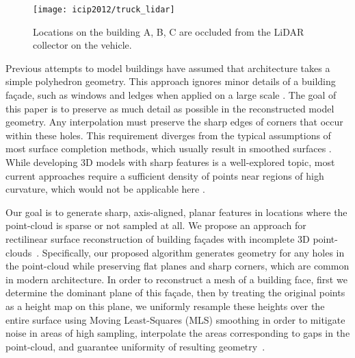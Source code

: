 \documentclass[12pt,onecolumn,oneside]{book}
\begin{document}
\begin{figure}[t]

\begin{minipage}[b]{1.0\linewidth}
  \centering
  \centerline{\texttt{[image: icip2012/truck\_lidar]}}
\end{minipage}

\caption[Scanning building fa\c{c}ades from a vehicle.]{Locations on the building A, B, C are occluded from the LiDAR collector on the vehicle.}
\label{fig:truck_lidar}

\end{figure}

Previous attempts to model buildings have assumed that architecture takes a simple polyhedron geometry. This approach ignores minor details of a building fa\c{c}ade, such as windows and ledges when applied on a large scale \cite{Chauve10, Chen07}.  The goal of this paper is to preserve as much detail as possible in the reconstructed model geometry.  Any interpolation must preserve the sharp edges of corners that occur within these holes.  This requirement diverges from the typical assumptions of most surface completion methods, which usually result in smoothed surfaces \cite{Kazhdan06, Kawai11}.  While developing 3D models with sharp features is a well-explored topic, most current approaches require a sufficient density of points near regions of high curvature, which would not be applicable here \cite{Bernardini04, Mhatre06}.  

Our goal is to generate sharp, axis-aligned, planar features in locations where the point-cloud is sparse or not sampled at all.  We propose an approach for rectilinear surface reconstruction of building fa\c{c}ades with incomplete 3D point-clouds~\cite{Turner12outdoor}.  Specifically, our proposed algorithm generates geometry for any holes in the point-cloud while preserving flat planes and sharp corners, which are common in modern architecture.  In order to reconstruct a mesh of a building face, first we determine the dominant plane of this fa\c{c}ade, then by treating the original points as a height map on this plane, we uniformly resample these heights over the entire surface using Moving Least-Squares (MLS) smoothing in order to mitigate noise in areas of high sampling, interpolate the areas corresponding to gaps in the point-cloud, and guarantee uniformity of resulting geometry~\cite{Nealen04}.
\end{document}
